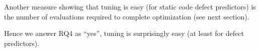 \documentclass{sig-alternative}
\begin{document}
Another measure showing that tuning is easy 
(for static code defect predictors)
is the number of evaluations required to complete optimization
(see next section).

Hence we answer RQ4 as ``yes'', tuning is surprisingly easy (at least
for defect predictors).





  


 
  
\end{document}

